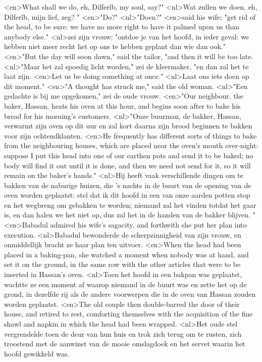 <en>What shall we do, eh, Dilferîb, my soul, say?"
<nl>Wat zullen we doen, eh, Dilferîb, mijn lief, zeg? "
<en>"Do?"
<nl>"Doen?"
<en>said his wife; "get rid of the head, to be sure: we have no more right to have it palmed upon us than anybody else."
<nl>zei zijn vrouw; "ontdoe je van het hoofd, in ieder geval: we hebben niet meer recht  het op ons te hebben geplant dan wie dan ook."
<en>"But the day will soon dawn," said the tailor, "and then it will be too late.
<nl>"Maar het zal  spoedig licht worden," zei de kleermaker, "en dan zal het te laat zijn.
<en>Let us be doing something at once."
<nl>Laat ons iets doen op dit moment."
<en>"A thought has struck me," said the old woman.
<nl>"Een gedachte is bij me opgekomen," zei de oude vrouw.
<en>"Our neighbour, the baker, Hassan, heats his oven at this hour, and begins soon after to bake his bread for his morning's customers.
<nl>"Onze buurman, de bakker, Hassan, verwarmt zijn oven op dit uur en zal kort daarna  zijn brood beginnen te bakken voor zijn ochtendklanten.
<en>He frequently has different sorts of things to bake from the neighbouring houses, which are placed near the oven's mouth over-night: suppose I put this head into one of our earthen pots and send it to be baked; no body will find it out until it is done, and then we need not send for it, so it will remain on the baker's hands."
<nl>Hij heeft vaak verschillende dingen om te bakken van de naburige huizen, die 's nachts in de buurt van de opening van de oven worden geplaatst: stel dat ik dit hoofd in een van onze aarden potten stop en het wegbreng  om gebakken te worden; niemand zal het vinden totdat het gaar is, en dan halen  we het niet op, dus zal het in de handen van de bakker blijven. "
<en>Babadul admired his wife's sagacity, and forthwith she put her plan into execution.
<nl>Babadul bewonderde de scherpzinnigheid van zijn vrouw, en onmiddellijk bracht ze haar plan ten uitvoer.
<en>When the head had been placed in a baking-pan, she watched a moment when nobody was at hand, and set it on the ground, in the same row with the other articles that were to be inserted in Hassan's oven.
<nl>Toen het hoofd in een bakpan was geplaatst, wachtte ze een moment af waarop niemand in de buurt was en zette het op de grond, in dezelfde rij als de andere voorwerpen die in de oven van Hassan zouden worden geplaatst.
<en>The old couple then double-barred the door of their house, and retired to rest, comforting themselves with the acquisition of the fine shawl and napkin in which the head had been wrapped.
<nl>Het oude stel vergrendelde toen de deur van hun huis en trok zich terug om te rusten, zich troostend met de aanwinst van de mooie omslagdoek en het servet waarin het hoofd gewikkeld was.
